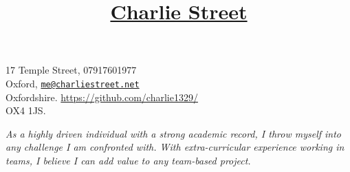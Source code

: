 \documentclass[11pt]{article}
\title{\vspace{-80pt}\underline{Charlie Street}}
\date{}
\begin{document}
	\maketitle
	\vspace*{-60pt}
	\begin{flushleft}
	\noindent
	\large 17 Temple Street,
	\hfill
	\large 07917601977 \\
	\large Oxford,
	\hfill 
	\large \href{mailto:me@charliestreet.net}{\nolinkurl{me@charliestreet.net}} \\
	\large Oxfordshire. 
	\hfill
	\large
	\url{https://github.com/charlie1329/}\\
	\large OX4 1JS. \\
	\end{flushleft}

	\vspace{-15pt}
	\begin{center}
			\textit{\large As a highly driven individual with a strong academic record, I throw myself into any challenge I am confronted with. With extra-curricular experience working in teams, I believe I can add value to any team-based project.}
	\end{center}
			
\end{document}
